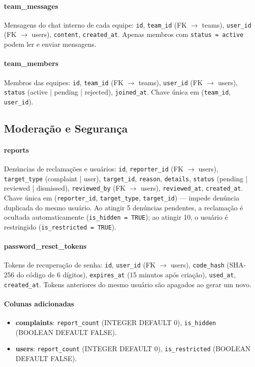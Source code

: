 \paragraph{team\_messages}
Mensagens do chat interno de cada equipe: \texttt{id},
\texttt{team\_id} (FK $\to$ teams), \texttt{user\_id} (FK $\to$ users),
\texttt{content}, \texttt{created\_at}. Apenas membros com
\texttt{status = active} podem ler e enviar mensagens.

\paragraph{team\_members}
Membros das equipes: \texttt{id}, \texttt{team\_id} (FK $\to$ teams),
\texttt{user\_id} (FK $\to$ users), \texttt{status} (active | pending |
rejected), \texttt{joined\_at}. Chave única em
(\texttt{team\_id}, \texttt{user\_id}).

\subsection*{Moderação e Segurança}

\paragraph{reports}
Denúncias de reclamações e usuários: \texttt{id}, \texttt{reporter\_id}
(FK $\to$ users), \texttt{target\_type} (complaint | user),
\texttt{target\_id}, \texttt{reason}, \texttt{details},
\texttt{status} (pending | reviewed | dismissed), \texttt{reviewed\_by}
(FK $\to$ users), \texttt{reviewed\_at}, \texttt{created\_at}.
Chave única em (\texttt{reporter\_id}, \texttt{target\_type},
\texttt{target\_id}) — impede denúncia duplicada do mesmo usuário.
Ao atingir 5 denúncias pendentes, a reclamação é ocultada automaticamente
(\texttt{is\_hidden = TRUE}); ao atingir 10, o usuário é restringido
(\texttt{is\_restricted = TRUE}).

\paragraph{password\_reset\_tokens}
Tokens de recuperação de senha: \texttt{id}, \texttt{user\_id}
(FK $\to$ users), \texttt{code\_hash} (SHA-256 do código de 6 dígitos),
\texttt{expires\_at} (15 minutos após criação), \texttt{used\_at},
\texttt{created\_at}. Tokens anteriores do mesmo usuário são apagados ao
gerar um novo.

\paragraph{Colunas adicionadas}
\begin{itemize}
  \item \textbf{complaints}: \texttt{report\_count} (INTEGER DEFAULT 0),
        \texttt{is\_hidden} (BOOLEAN DEFAULT FALSE).
  \item \textbf{users}: \texttt{report\_count} (INTEGER DEFAULT 0),
        \texttt{is\_restricted} (BOOLEAN DEFAULT FALSE).
\end{itemize}

